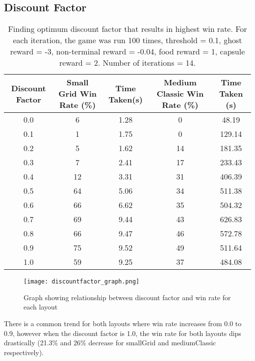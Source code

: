 \documentclass[12pt]{report}
\begin{document}
      \subsection*{Discount Factor}
        \begin{table}[H]
          \begin{center}
            \begin{adjustbox}{max width=\textwidth}
              \begin{tabular}{*{5}{c}}

                \textbf{Discount Factor} & \textbf{Small Grid Win Rate (\%)} & \textbf{Time Taken(s)} & \textbf{Medium Classic Win Rate (\%)} & \textbf{Time Taken (s)}\\
                \hline
                0.0 & 6 & 1.28 & 0 & 48.19\\
                0.1 & 1 & 1.75 & 0 & 129.14\\
                0.2 & 5 & 1.62 & 14 & 181.35\\
                0.3 & 7 & 2.41 & 17 & 233.43\\
                0.4 & 12 & 3.31 & 31 & 406.39\\
                0.5 & 64 & 5.06 & 34 & 511.38\\
                0.6 & 66 & 6.62 & 35 & 504.32\\
                0.7 & 69 & 9.44 & 43 & 626.83\\
                0.8 & 66 & 9.47 & 46 & 572.78\\
                0.9 & 75 & 9.52 & 49 & 511.64\\
                1.0 & 59 & 9.25 & 37 & 484.08\\
              \end{tabular}
            \end{adjustbox}
            \caption{Finding optimum discount factor that results in highest win rate. For each iteration, the game was run 100 times, threshold = 0.1, ghost reward = -3, non-terminal reward = -0.04, food reward = 1, capsule reward = 2. Number of iterations = 14.}
              \label{tab:table4}
        \end{center}
      \end{table}
      \vspace{-13mm}
      \begin{figure}[H]
        \centering
        \texttt{[image: discountfactor\_graph.png]}
        \caption{Graph showing relationship between discount factor and win rate for each layout}
      \end{figure}
      There is a common trend for both layouts where win rate increases from 0.0 to 0.9, however when the discount factor is 1.0, the win rate for both layouts dips drastically (21.3\% and 26\% decrease for smallGrid and mediumClassic respectively).
\end{document}

